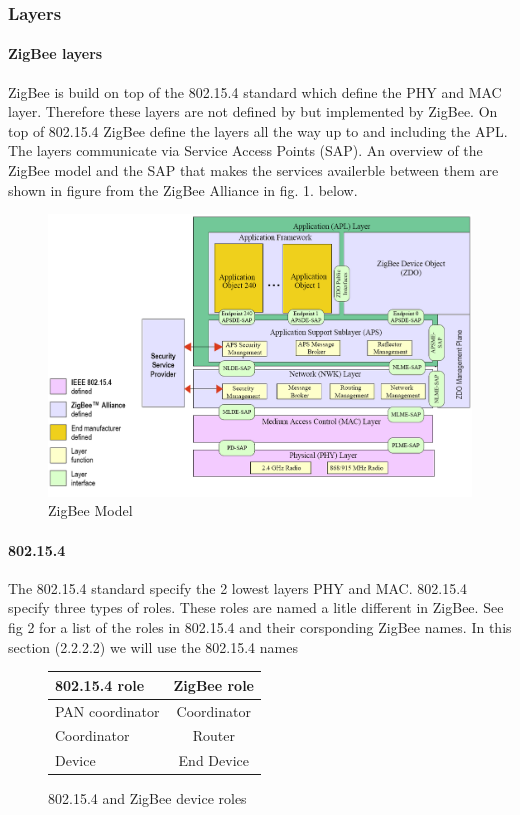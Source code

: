 \documentclass[a4paper,12pt,english]{article}
\begin{document}
\subsubsection{Layers}
\paragraph{ZigBee layers}
ZigBee is build on top of the 802.15.4 standard which define the PHY and MAC
layer. Therefore these layers are not defined by but implemented by
ZigBee.
On top of 802.15.4 ZigBee define the layers all the way up to and including
the APL. The layers communicate via Service Access Points
(SAP). An overview of the ZigBee
model and the SAP that makes the services availerble between
them are shown in figure from the ZigBee Alliance in fig. 1. below.
\begin{figure}[h]
\includegraphics[width=\textwidth]{zigbeeLayers.png}
\caption{ZigBee Model\cite{zigbeeModel}}
\end{figure}

\paragraph{802.15.4}
The 802.15.4 standard specify the 2 lowest layers PHY and MAC. 802.15.4 specify
three types of roles. These roles are named a litle different in ZigBee. See fig
2 for a list of the roles in 802.15.4 and their corsponding ZigBee names. In this section (2.2.2.2) we will use the 802.15.4 names 

\begin{figure}[h]
\begin{center}
\begin{tabular}{| l | c |}
  \hline
  802.15.4 role & ZigBee role\\
  \hline
  PAN coordinator & Coordinator\\
  \hline
  Coordinator & Router\\
  \hline
  Device & End Device\\
  \hline
\end{tabular}
\end{center}
\caption{802.15.4 and ZigBee device roles}
\end{figure}
\end{document}
